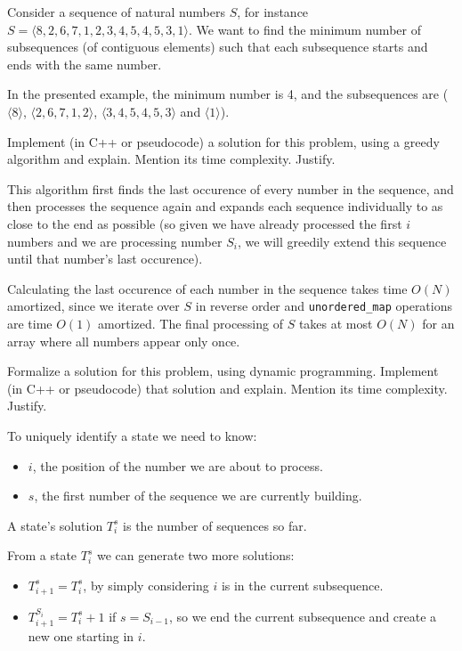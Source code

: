 {
\renewcommand{\thechapter}{\arabic{chapter}R}
\setcounter{chapter}{16}

Consider a sequence of natural numbers $S$, for instance $S = \langle 8, 2, 6, 7, 1, 2, 3, 4, 5, 4, 5, 3, 1 \rangle$. We want to find the minimum number of subsequences (of contiguous elements) such that each subsequence starts and ends with the same number.

In the presented example, the minimum number is 4, and the subsequences are ($\langle 8 \rangle$, $\langle 2, 6, 7, 1, 2 \rangle$, $\langle 3, 4, 5, 4, 5, 3 \rangle$ and $\langle 1 \rangle$).

Implement (in C++ or pseudocode) a solution for this problem, using a greedy algorithm and explain. Mention its time complexity. Justify.

\ansseparator



This algorithm first finds the last occurence of every number in the sequence, and then processes the sequence again and expands each sequence individually to as close to the end as possible (so given we have already processed the first $i$ numbers and we are processing number $S_i$, we will greedily extend this sequence until that number's last occurence).

Calculating the last occurence of each number in the sequence takes time $O(N)$ amortized, since we iterate over $S$ in reverse order and \texttt{unordered\_map} operations are time $O(1)$ amortized. The final processing of $S$ takes at most $O(N)$ for an array where all numbers appear only once.

Formalize a solution for this problem, using dynamic programming. Implement (in C++ or pseudocode) that solution and explain. Mention its time complexity. Justify.

\ansseparator

To uniquely identify a state we need to know:
\begin{itemize}
    \item $i$, the position of the number we are about to process.
    \item $s$, the first number of the sequence we are currently building.
\end{itemize}

A state's solution $T_i^s$ is the number of sequences so far.

From a state $T_i^s$ we can generate two more solutions:
\begin{itemize}
    \item $T_{i+1}^s = T_i^s$, by simply considering $i$ is in the current subsequence.
    \item $T_{i+1}^{S_i} = T_i^s + 1$ if $s = S_{i-1}$, so we end the current subsequence and create a new one starting in $i$.
\end{itemize}

}
